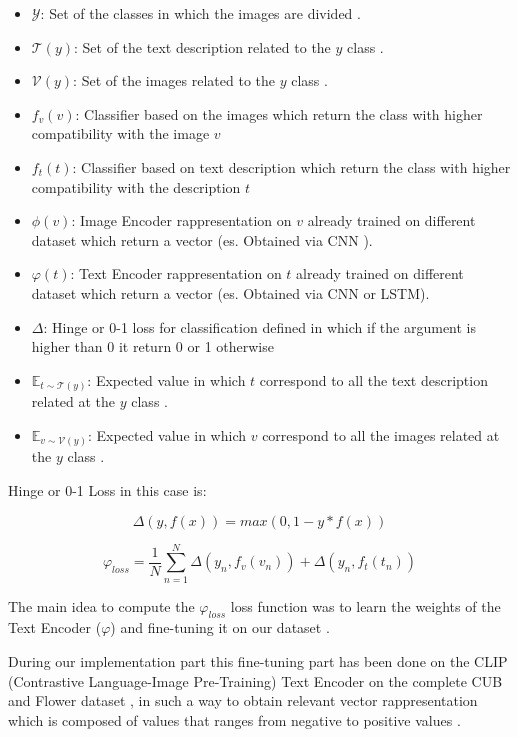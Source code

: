 \begin{itemize}
    \item $\mathcal{Y}$: Set of the classes in which the images are divided .
    \item $\mathcal{T}(y)$: Set of the text description related to the $y$ class .
    \item $\mathcal{V}(y)$: Set of the images related to the $y$ class .
    \item $f_v(v)$: Classifier based on the images which return the class with higher compatibility with the image $v$
    \item $f_t(t)$: Classifier based on text description which return the class with higher compatibility with the description $t$
    \item $\phi(v)$: Image Encoder rappresentation on $v$ already trained on different dataset which return a vector (es. Obtained via CNN ).
    \item $\varphi(t)$: Text Encoder rappresentation on $t$ already trained on different dataset which return a vector (es. Obtained via CNN or LSTM).
    \item $\Delta$: Hinge or 0-1 loss for classification defined in which if the argument is higher than 0 it return 0 or 1 otherwise
    \item $\mathbb{E}_{t \sim \mathcal{T}(y)}$: Expected value in which $t$ correspond to all the text description related at the $y$ class .
    \item $\mathbb{E}_{v \sim \mathcal{V}(y)}$:  Expected value in which $v$ correspond to all the images related at the $y$ class .
\end{itemize}

Hinge or 0-1 Loss in this case is:

\begin{equation}
    \Delta( y, f(x) ) = max (0 , 1 - y * f(x) )
\end{equation}



\begin{equation}
    \varphi_{loss} = \frac{1}{N} \sum_{n=1}^{N} \Delta(y_n, f_v(v_n)) + \Delta(y_n, f_t(t_n)) 
\end{equation}

The main idea to compute the $\varphi_{loss}$ loss function was to learn the weights of 
the Text Encoder ($\varphi$) and fine-tuning it on our dataset .

During our implementation part this fine-tuning part has been done on 
the CLIP (Contrastive Language-Image Pre-Training) Text Encoder on the 
complete CUB and Flower dataset , in such a way to obtain 
relevant vector rappresentation which is composed of values that ranges 
from negative to positive values .

